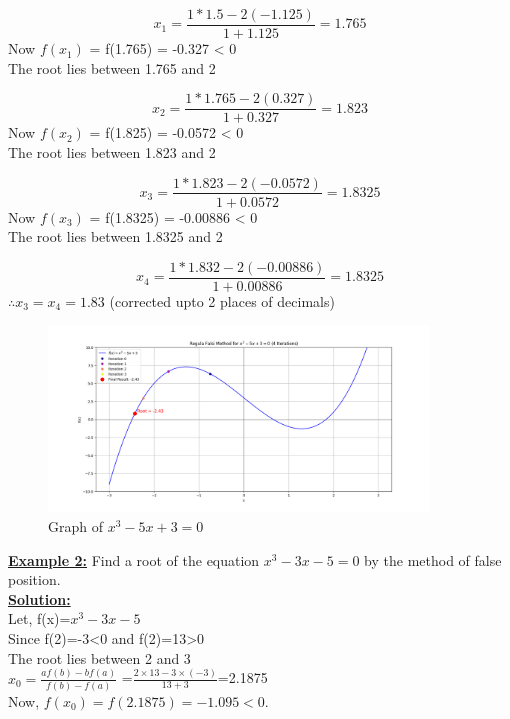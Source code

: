 \documentclass[12pt,a4paper]{article}
\begin{document}
		\[
		x_1 = \frac{1*1.5 - 2(-1.125)}{1+1.125} = 1.765
		\]
		Now \(f(x_1)\) = f(1.765) = -0.327 < 0 \\
		The root lies between 1.765 and 2
		
		\[
		x_2 = \frac{1*1.765 - 2(0.327)}{1+0.327} =1.823
		\]
		Now \(f(x_2)\) = f(1.825) = -0.0572 < 0 \\
		The root lies between 1.823 and 2
		
		\[
		x_3 = \frac{1*1.823 - 2(-0.0572)}{1+0.0572} =1.8325
		\]
		Now \(f(x_3)\) = f(1.8325) = -0.00886 < 0 \\
		The root lies between 1.8325 and 2
		
		\[
		x_4 = \frac{1*1.832 - 2(-0.00886)}{1+0.00886} =1.8325
		\]
		$\therefore x_3 = x_4 = 1.83$ (corrected upto 2 places of decimals)
		
		\begin{figure}[h]
			\centering
			\includegraphics[width=0.9\textwidth]{regula_falsi_ex1.png} %
			\caption{Graph of $x^3 - 5x + 3 = 0$}
			\label{fig:your_label_here}
		\end{figure} 
		\newpage
		
			
			\textbf{\underline{Example 2:}} Find a root of the equation $x^3-3x-5=0$ by the method of false position. \\
			
			\textbf{\underline{Solution:}}\\ Let,
			f(x)=$x^3-3x-5$\\
			Since f(2)=-3<0 and f(2)=13>0 \\
			The root lies between 2 and 3 \\
			
			
			
			$x_0=\frac{af(b)-bf(a)}{f(b)-f(a)}$
			=$\frac{2\times13-3\times(-3)}{13+3}$=2.1875\\

			Now, $f(x_0) = f(2.1875) = -1.095 < 0$.
			
\end{document}

